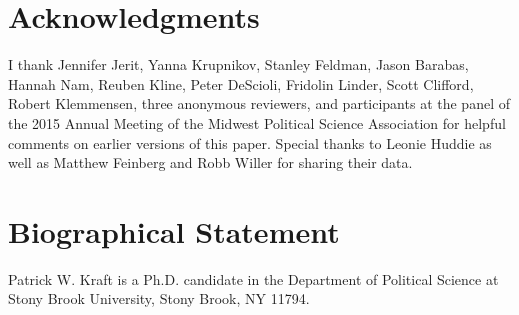 \documentclass[12pt]{article}
\begin{document}



\section*{Acknowledgments}
I thank Jennifer Jerit, Yanna Krupnikov, Stanley Feldman, Jason Barabas, Hannah Nam, Reuben Kline, Peter DeScioli, Fridolin Linder, Scott Clifford, 
Robert Klemmensen, three anonymous reviewers, and participants at the panel of the 2015 Annual Meeting of the Midwest Political Science Association for helpful comments on earlier versions of this paper. Special thanks to Leonie Huddie as well as Matthew Feinberg and Robb Willer for sharing their data.

\section*{Biographical Statement}

Patrick W. Kraft is a Ph.D. candidate in the Department of Political Science at Stony Brook University, Stony Brook, NY 11794.
\end{document}
